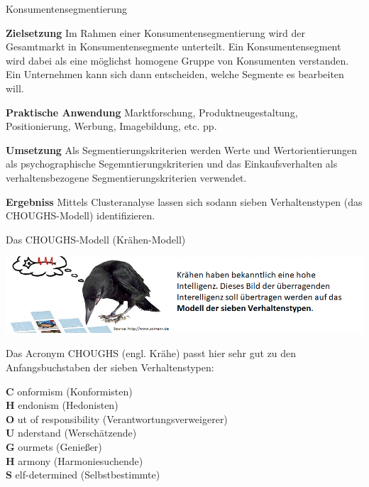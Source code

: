 \documentclass[12pt,ngerman,a4paper,ignorenonframetext,]{beamer}
\begin{document}
\begin{frame}{Konsumentensegmentierung}
\protect\hypertarget{konsumentensegmentierung}{}

\textbf{Zielsetzung} Im Rahmen einer Konsumentensegmentierung wird der
Gesamtmarkt in Konsumentensegmente unterteilt. Ein Konsumentensegment
wird dabei als eine möglichst homogene Gruppe von Konsumenten
verstanden. Ein Unternehmen kann sich dann entscheiden, welche Segmente
es bearbeiten will.

\textbf{Praktische Anwendung} Marktforschung, Produktneugestaltung,
Positionierung, Werbung, Imagebildung, etc. pp.

\textbf{Umsetzung} Als Segmentierungskriterien werden Werte und
Wertorientierungen als psychographische Segemntierungskriterien und das
Einkaufsverhalten als verhaltensbezogene Segmentierungskriterien
verwendet.

\textbf{Ergebniss} Mittels Clusteranalyse lassen sich sodann sieben
Verhaltenstypen (das CHOUGHS-Modell) identifizieren.

\end{frame}

\begin{frame}{Das CHOUGHS-Modell (Krähen-Modell)}
\protect\hypertarget{das-choughs-modell-krahen-modell}{}

\begin{center}\includegraphics[width=0.8\linewidth]{./images/Marketingcontrolling/choughs} \end{center}

Das Acronym CHOUGHS (engl. Krähe) passt hier sehr gut zu den
Anfangsbuchstaben der sieben Verhaltenstypen:

\textbf{C} onformism (Konformisten)\\
\textbf{H} endonism (Hedonisten)\\
\textbf{O} ut of responsibility (Verantwortungsverweigerer)\\
\textbf{U} nderstand (Werschätzende)\\
\textbf{G} ourmets (Genießer)\\
\textbf{H} armony (Harmoniesuchende)\\
\textbf{S} elf-determined (Selbstbestimmte)

\end{frame}
\end{document}
